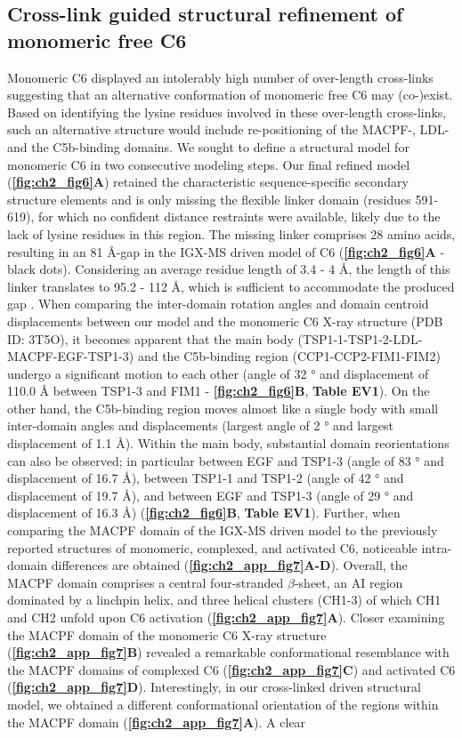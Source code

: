 \subsection*{Cross-link guided structural refinement of monomeric free C6}
Monomeric C6 displayed an intolerably high number of over-length cross-links suggesting that an alternative conformation of monomeric free C6 may (co-)exist. Based on identifying the lysine residues involved in these over-length cross-links, such an alternative structure would include re-positioning of the MACPF-, LDL- and the C5b-binding domains. We sought to define a structural model for monomeric C6 in two consecutive modeling steps. Our final refined model (\textbf{\autoref{fig:ch2_fig6}A}) retained the characteristic sequence-specific secondary structure elements and is only missing the flexible linker domain (residues 591-619), for which no confident distance restraints were available, likely due to the lack of lysine residues in this region. The missing linker comprises 28 amino acids, resulting in an 81 Å-gap in the IGX-MS driven model of C6 (\textbf{\autoref{fig:ch2_fig6}A} - black dots). Considering an average residue length of 3.4 - 4 Å, the length of this linker translates to 95.2 - 112 Å, which is sufficient to accommodate the produced gap \cite{Ainavarapu_2007}. When comparing the inter-domain rotation angles and domain centroid displacements between our model and the monomeric C6 X-ray structure (PDB ID: 3T5O), it becomes apparent that the main body (TSP1-1-TSP1-2-LDL-MACPF-EGF-TSP1-3) and the C5b-binding region (CCP1-CCP2-FIM1-FIM2) undergo a significant motion to each other (angle of 32 ° and displacement of 110.0 Å between TSP1-3 and FIM1 - \textbf{\autoref{fig:ch2_fig6}B}, \textbf{Table EV1}). On the other hand, the C5b-binding region moves almost like a single body with small inter-domain angles and displacements (largest angle of 2 ° and largest displacement of 1.1 Å). Within the main body, substantial domain reorientations can also be observed; in particular between EGF and TSP1-3 (angle of 83 ° and displacement of 16.7 Å), between TSP1-1 and TSP1-2 (angle of 42 ° and displacement of 19.7 Å), and between EGF and TSP1-3 (angle of 29 ° and displacement of 16.3 Å) (\textbf{\autoref{fig:ch2_fig6}B}, \textbf{Table EV1}). Further, when comparing the MACPF domain of the IGX-MS driven model to the previously reported structures of monomeric, complexed, and activated C6, noticeable intra-domain differences are obtained (\textbf{\autoref{fig:ch2_app_fig7}A-D}). Overall, the MACPF domain comprises a central four-stranded $\beta$-sheet, an AI region dominated by a linchpin helix, and three helical clusters (CH1-3) of which CH1 and CH2 unfold upon C6 activation (\textbf{\autoref{fig:ch2_app_fig7}A}). Closer examining the MACPF domain of the monomeric C6 X-ray structure (\textbf{\autoref{fig:ch2_app_fig7}B}) revealed a remarkable conformational resemblance with the MACPF domains of complexed C6 (\textbf{\autoref{fig:ch2_app_fig7}C}) and activated C6 (\textbf{\autoref{fig:ch2_app_fig7}D}). Interestingly, in our cross-linked driven structural model, we obtained a different conformational orientation of the regions within the MACPF domain (\textbf{\autoref{fig:ch2_app_fig7}A}). A clear 